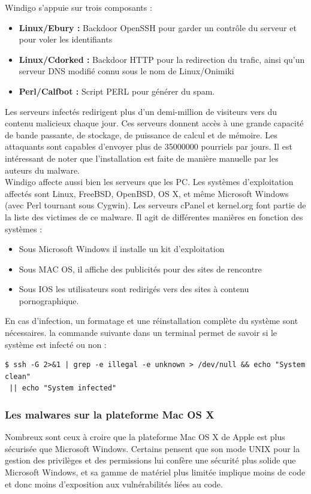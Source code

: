 Windigo s'appuie sur trois composants :
\begin{itemize}
\item \textbf{Linux/Ebury : }Backdoor OpenSSH pour garder un contrôle du serveur et pour voler les identifiants
\item \textbf{Linux/Cdorked : }Backdoor HTTP pour la redirection du trafic, ainsi qu’un serveur DNS modifié connu sous le nom de Linux/Onimiki
\item \textbf{Perl/Calfbot : }Script PERL pour générer du spam.

\end{itemize}
Les serveurs infectés redirigent plus d'un demi-million de visiteurs vers du contenu malicieux chaque jour. Ces serveurs donnent accès à une grande capacité de bande passante, de stockage, de puissance de calcul et de mémoire. Les attaquants sont capables d'envoyer plus de 35000000 pourriels par jours. Il est intéressant de noter que l'installation est faite de manière manuelle par les auteurs du malware.\\

Windigo affecte aussi bien les serveurs que les PC. Les systèmes d'exploitation affectés sont Linux, FreeBSD, OpenBSD, OS X, et même Microsoft Windows (avec Perl tournant sous Cygwin). Les serveurs cPanel et kernel.org font partie de la liste des victimes de ce malware. Il agit de différentes manières en fonction des systèmes :
\begin{itemize}

\item Sous Microsoft Windows il installe un kit d’exploitation
\item Sous MAC OS, il affiche des publicités pour des sites de rencontre
\item Sous IOS les utilisateurs sont redirigés vers des sites à contenu pornographique.

\end{itemize}
En cas d'infection, un formatage et une réinstallation complète du système sont nécessaires. la commande suivante dans un terminal permet de savoir si le système est infecté ou non :\\
\begin{lstlisting}
$ ssh -G 2>&1 | grep -e illegal -e unknown > /dev/null && echo "System clean"
 || echo "System infected"
\end{lstlisting}
\subsubsection{Les malwares sur la plateforme Mac OS X}
Nombreux sont ceux à croire que la plateforme Mac OS X de Apple est plus sécurisée que Microsoft Windows. Certains pensent que son mode UNIX pour la gestion des privilèges et des permissions lui confère une sécurité plus solide que Microsoft Windows, et sa gamme de matériel plus limitée implique moins de code et donc moins d'exposition aux vulnérabilités liées au code.\\


